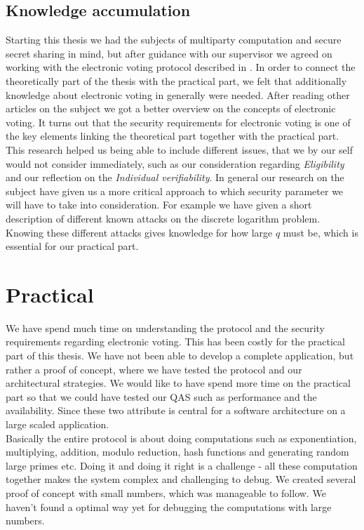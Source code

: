 \subsection{Knowledge accumulation}
Starting this thesis we had the subjects of multiparty computation and secure secret sharing in mind, but after guidance with our supervisor we agreed on working with the electronic voting protocol described in \cite{Schoenmakers1999}. In order to connect the theoretically part of the thesis with the practical part, we felt that additionally knowledge about electronic voting in generally were needed. After reading other articles on the subject we got a better overview on the concepts of electronic voting. It turns out that the security requirements for electronic voting is one of the key elements linking the theoretical part together with the practical part. This research helped us being able to include different issues, that we by our self would not consider immediately, such as our consideration regarding \textit{Eligibility} and our reflection on the \textit{Individual verifiability}. In general our research on the subject have given us a more critical approach to which security parameter we will have to take into consideration. For example we have given a short description of different known attacks on the discrete logarithm problem. Knowing these different attacks gives knowledge for how large $q$ must be, which is essential for our practical part.   


\section{Practical}
We have spend much time on understanding the protocol and the security requirements regarding electronic voting. This has been costly for the practical part of this thesis. We have not been able to develop a complete application, but rather a proof of concept, where we have tested the protocol and our architectural strategies. We would like to have spend more time on the practical part so that we could have tested our QAS such as performance and the availability. Since these two attribute is central for a software architecture on a large scaled application. \\

\noindent
Basically the entire protocol is about doing computations such as exponentiation, multiplying, addition,  modulo reduction, hash functions and generating random large primes etc. Doing it and doing it right is a challenge - all these computation together  makes the system complex and challenging to debug. We created several proof of concept with small numbers, which was manageable to follow. We haven't found a optimal way yet for debugging the computations with large numbers. \\

